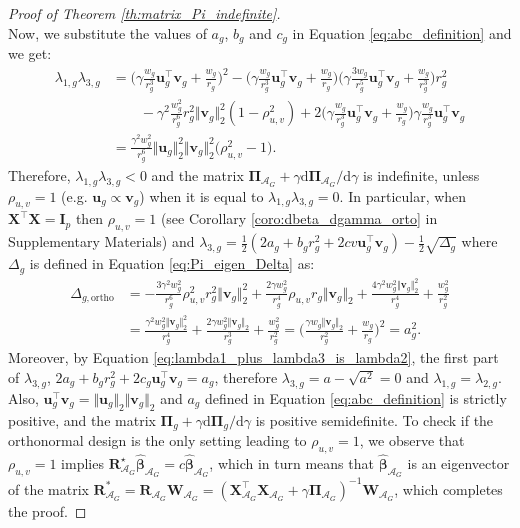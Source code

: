 \documentclass[a4paper, 12pt]{article}
\newcommand{\Aset}{\mathcal{A}}
\newcommand{\T}{\top}
\def\bbeta{\boldsymbol{\beta}}
\def\bPi{\boldsymbol{\Pi}}
\def\bu{\boldsymbol{u}}
\def\bv{\boldsymbol{v}}
\def\bI{\mathbf{I}}
\def\bR{\mathbf{R}}
\def\bW{\mathbf{W}}
\def\bX{\mathbf{X}}
\def\bu{\mathbf{u}}
\def\bv{\mathbf{v}}
\begin{document}
\begin{appendix}
\begin{proof}[Proof of Theorem \ref{th:matrix_Pi_indefinite}]
\begin{equation*}
\end{equation*}
Now, we substitute the values of $a_g$, $b_g$ and $c_g$ in Equation \eqref{eq:abc_definition} and we get:
\begin{equation*}
\begin{aligned}
\lambda_{1,g}\lambda_{3,g}&=\Big(\gamma\frac{w_g}{r_g^3}\bu_g^{\T}\bv_g+\frac{w_g}{r_g}\Big)^2-\Big(\gamma\frac{w_g}{r_g^3}\bu_g^{\T}\bv_g+\frac{w_g}{r_g}\Big)\Big(\gamma\frac{3w_g}{r_g^5}\bu_g^{\T}\bv_g+\frac{w_g}{r_g^3}\Big)r_g^2\\
&\qquad-\gamma^2\frac{w_g^2}{r_g^6}r_g^2\Vert\bv_g\Vert_2^2(1-\rho_{u,v}^2)+2\Big(\gamma\frac{w_g}{r_g^3}\bu_g^{\T}\bv_g+\frac{w_g}{r_g}\Big)\gamma\frac{w_g}{r_g^3}\bu_g^{\T}\bv_g\\
&=\frac{\gamma^2w_g^2}{r_g^6}\Vert\bu_g\Vert_2^2\Vert\bv_g\Vert_2^2\big(\rho_{u,v}^2-1\big).
\end{aligned}
\end{equation*}
Therefore, $\lambda_{1,g}\lambda_{3,g}<0$ and the matrix $\bPi_{\Aset_G}+\gamma\mathrm{d}\bPi_{\Aset_G}/\mathrm{d}\gamma$ is indefinite, unless $\rho_{u,v}=1$ (e.g. $\bu_g\propto\bv_g$) when it is equal to $\lambda_{1,g}\lambda_{3,g}=0$. In particular, when $\bX^{\T}\bX=\bI_p$ then $\rho_{u,v}=1$ (see Corollary \ref{coro:dbeta_dgamma_orto} in Supplementary Materials) and $\lambda_{3,g}=\frac{1}{2}(2a_g+b_g r_g^2+2cv\bu_g^{\T}\bv_g)-\frac{1}{2} \sqrt{\Delta_g}$ where $\Delta_g$ is defined in Equation \eqref{eq:Pi_eigen_Delta} as:
\begin{equation*}
\begin{aligned}
\Delta_{g,\textrm{ortho}}&=-\frac{3\gamma^2w_g^2}{r_g^6}\rho_{u,v}^2r_g^2\Vert\bv_g\Vert_2^2+\frac{2\gamma w_g^2}{r_g^4}\rho_{u,v} r_g\Vert\bv_g\Vert_2+\frac{4\gamma^2w_g^2\Vert\bv_g\Vert_2^2}{r_g^4}+\frac{w_g^2}{r_g^2}\\
&=\frac{\gamma^2w_g^2\Vert\bv_g\Vert_2^2}{r_g^4}+\frac{2\gamma w_g^2\Vert\bv_g\Vert_2}{r_g^3}+\frac{w_g^2}{r_g^2}=\Bigg(\frac{\gamma w_g\Vert\bv_g\Vert_2}{r_g^2}+\frac{w_g}{r_g}\Bigg)^2=a_g^2.
\end{aligned}
\end{equation*}
Moreover, by Equation \eqref{eq:lambda1_plus_lambda3_is_lambda2}, the first part of $\lambda_{3,g}$, $2a_g+b_g r_g^2+2c_g\bu_g^{\T}\bv_g=a_g$, therefore $\lambda_{3,g}=a-\sqrt{a^2}=0$ and $\lambda_{1,g}=\lambda_{2,g}$. Also, $\bu_g^{\T}\bv_g=\Vert\bu_g\Vert_2\Vert\bv_g\Vert_2$ and $a_g$ defined in Equation \eqref{eq:abc_definition} is strictly positive, and the matrix $\bPi_{g} + \gamma \mathrm{d}\bPi_{g}/\mathrm{d}\gamma$ is positive semidefinite. To check if the orthonormal design is the only setting leading to $\rho_{u,v}=1$, we observe that $\rho_{u,v}=1$ implies $\bR_{\Aset_G}^\star\widehat{\bbeta}_{\Aset_G} = c \widehat{\bbeta}_{\Aset_G}$, which in turn means that $\widehat{\bbeta}_{\Aset_G}$ is an eigenvector of the matrix $\bR^*_{\Aset_G} = \bR_{\Aset_G}\bW_{\Aset_G} = (\bX_{\Aset_G}^{\T} \bX_{\Aset_G} + \gamma \bPi_{\Aset_G})^{-1} \bW_{\Aset_G}$, which completes the proof.

\end{proof}
\end{appendix}
\end{document}
